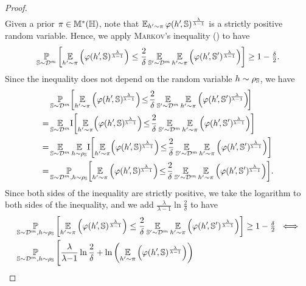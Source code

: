 \begin{noaddcontents}
\begin{proof}
\begin{align}
    \label{chap:dis-pra:eq:disintegrated-proof-1}
\end{align}
Given a prior $\pi\in\mathbb{M}^{*}(\mathbb{H})$, note that $\operatorname*{\mathbb{E}}_{h'{\sim}\pi}\varphi(h'\!, \mathbb{S})^{\frac{\lambda}{\lambda-1}}$ is a strictly positive random variable. 
Hence, we apply \textsc{Markov}'s inequality () to have
\begin{align*}
    \operatorname*{\mathbb{P}}_{\mathbb{S}\sim\mathcal{D}^{m}}\left[\operatorname*{\mathbb{E}}_{h'{\sim}\pi}\left(\varphi(h'\!, \mathbb{S})^{\frac{\lambda}{\lambda-1}}\right) \le \frac{2}{\delta}\operatorname*{\mathbb{E}}_{\mathbb{S}'{\sim}\mathcal{D}^{m}}\operatorname*{\mathbb{E}}_{h'{\sim}\pi}\left(\varphi(h'\!, \mathbb{S}')^{\frac{\lambda}{\lambda-1}}\right)\right]\ge 1-\tfrac{\delta}{2}.
\end{align*}
Since the inequality does not depend on the random variable $h\sim \rho_{\mathbb{S}}$, we have
\begin{align*}
    &\PP_{\S\sim\D^{\m}}\!\LB\EE_{\h'{\sim}\P}\LP\varphi(\h'\!, \S)^{\!\frac{\lambda}{\lambda-1}}\RP \!\le\! \frac{2}{\delta}\EE_{\S'{\sim}\D^{\m}}\EE_{\h'{\sim}\P}\LP\varphi(\h'\!, \S')^{\!\frac{\lambda}{\lambda-1}}\RP\!\RB\\
    = &\EE_{\S\sim\D^{\m}}\!\indic\!\LB\EE_{\h'{\sim}\P}\!\LP\varphi(\h'\!, \S)^{\!\frac{\lambda}{\lambda-1}}\RP \!\le\! \frac{2}{\delta}\EE_{\S'{\sim}\D^{\m}}\EE_{\h'{\sim}\P}\LP\varphi(\h'\!, \S')^{\!\frac{\lambda}{\lambda-1}}\RP\RB\\
    = &\EE_{\S\sim\D^{\m}}\EE_{\h\sim \AQ}\!\indic\!\LB\EE_{\h'{\sim}\P}\!\LP\varphi(\h'\!, \S)^{\!\frac{\lambda}{\lambda-1}}\RP \!\le\! \frac{2}{\delta}\EE_{\S'{\sim}\D^{\m}}\EE_{\h'{\sim}\P}\LP\varphi(\h'\!, \S')^{\!\frac{\lambda}{\lambda-1}}\RP\RB\\
    = &\PP_{\S\sim\D^{\m},\h\sim \AQ}\!\LB\EE_{\h'{\sim}\P}\LP\varphi(\h'\!, \S)^{\!\frac{\lambda}{\lambda-1}}\RP \!\le\! \frac{2}{\delta}\EE_{\S'{\sim}\D^{\m}}\EE_{\h'{\sim}\P}\LP\varphi(\h'\!, \S')^{\!\frac{\lambda}{\lambda-1}}\RP\RB\!.
\end{align*}
Since both sides of the inequality are strictly positive, we take the logarithm to both sides of the inequality, and we add $\frac{\lambda}{\lambda-1}\ln\frac{2}{\delta}$ to have
\begin{align}
    &\PP_{\S\sim\D^{\m},\h\sim \AQ}\LB\EE_{\h'{\sim}\P}\LP\varphi(\h'\!, \S)^{\frac{\lambda}{\lambda-1}}\RP \le \frac{2}{\delta}\EE_{\S'{\sim}\D^{\m}}\EE_{\h'{\sim}\P}\LP\varphi(\h'\!, \S')^{\frac{\lambda}{\lambda-1}}\RP\RB\ge 1-\tfrac{\delta}{2} \hspace{0.1cm}\iff\nonumber\\
    &\PP_{\S\sim\D^{\m},\h\sim \AQ}\Bigg[\frac{\lambda}{\lambda{-}1}\ln\frac{2}{\delta}+\ln\LP\EE_{\h'{\sim}\P}\LP\varphi(\h'\!, \S)^{\frac{\lambda}{\lambda-1}}\RP\RP

\end{align}
\end{proof}
\end{noaddcontents}
